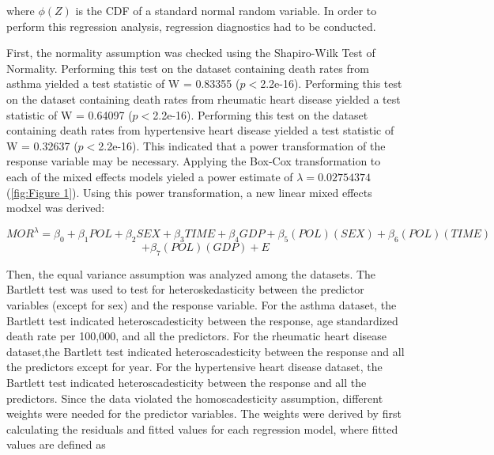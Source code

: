 \documentclass[12pt, letterpaper, twoside]{article}\usepackage[]{graphicx}\usepackage[]{xcolor}
\begin{document}
where \begin{math}\phi(Z)\end{math} is the CDF of a standard normal random
variable. In order to perform this regression analysis, regression diagnostics
had to be conducted.\par

First, the normality assumption was checked using the
Shapiro-Wilk Test of Normality. Performing this test on the dataset containing
death rates from asthma yielded a test statistic of W = 0.83355
(\begin{math}p<\end{math}2.2e-16). Performing this test on the dataset containing
death rates from rheumatic heart disease yielded a test statistic of W = 0.64097
(\begin{math}p<\end{math}2.2e-16). Performing this test on the dataset containing
death rates from hypertensive heart disease yielded a test statistic of
W = 0.32637 (\begin{math}p<\end{math}2.2e-16). This indicated that a power
transformation of the response variable may be necessary. Applying the Box-Cox
transformation to each of the mixed effects models yieled a power estimate of
\begin{math}\lambda=0.02754374\end{math} (\autoref{fig:Figure 1}). Using this
power transformation, a new linear mixed effects modxel was derived:

\[
  MOR^{\lambda} = \beta_{0} + \beta_{1}POL + \beta_{2}SEX + \beta_{3}TIME +\beta_{4}GDP
  + \beta_{5}(POL)(SEX) + \beta_{6}(POL)(TIME)
\]
\[
 + \beta_{7}(POL)(GDP) + E
\]

\par Then, the equal variance assumption was analyzed among the datasets. The
Bartlett test was used to test for heteroskedasticity between the predictor
variables (except for sex) and the response variable. For the asthma dataset,
the Bartlett test indicated heteroscadesticity between the response, age
standardized death rate per 100,000, and all the predictors. For the rheumatic
heart disease dataset,the Bartlett test indicated heteroscadesticity between the
response and all the predictors except for year. For the hypertensive heart
disease dataset, the Bartlett test indicated heteroscadesticity between the
response and all the predictors. Since the data violated the homoscadesticity
assumption, different weights were needed for the predictor variables. The weights
were derived by first calculating the residuals and fitted values for each regression
model, where fitted values are defined as
\end{document}
